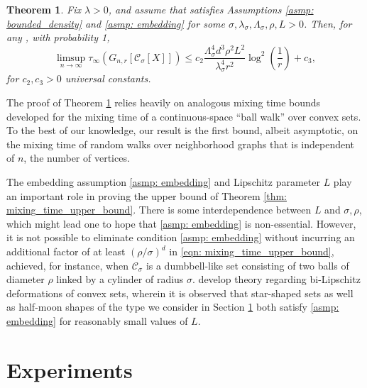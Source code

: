 \documentclass[11pt,twoside]{article}
\newtheorem{theorem}{Theorem}
\newcommand{\1}{\mathbf{1}}
\newcommand{\Xbf}{X}             %
\newcommand{\Cbb}{\mathbb{C}}
\newcommand{\Cset}{\mathcal{C}}
\newcommand{\Csig}{\Cset_{\sigma}}
\begin{document}
\begin{theorem}
  \label{thm: mixing_time_upper_bound}
  Fix $\lambda > 0$, and assume that \smash{$\Cset \in \Cbb_f(\lambda)$}
  satisfies Assumptions \ref{asmp: bounded_density} and \ref{asmp: embedding}
  for some $\sigma, \lambda_{\sigma}, \Lambda_{\sigma}, \rho, L > 0$. Then, for
  any , with probability 1,
  \begin{equation} 
    \label{eqn: mixing_time_upper_bound}
    \limsup_{n \to \infty}\tau_{\infty}(G_{n,r}[\Csig[\Xbf]]) \leq c_2
    \frac{\Lambda_{\sigma}^4 d^3 \rho^2 L^2}{\lambda_{\sigma}^4 r^2}
    \log^2\left(\frac{1}{r}\right) + c_3,
  \end{equation}
  for $c_2,c_3 > 0$ universal constants. 
\end{theorem}

The proof of Theorem \ref{thm: mixing_time_upper_bound} relies heavily on
analogous mixing time bounds developed for the mixing time of a
continuous-space ``ball walk'' over convex sets. To the best of our knowledge, our
result is the first bound, albeit asymptotic, on the mixing time of random walks
over neighborhood graphs that is independent of $n$, the number of vertices.   

\vspace{0.2cm}

  The embedding assumption \ref{asmp: embedding} and Lipschitz parameter $L$
  play an important role in proving the upper bound of Theorem \ref{thm:
    mixing_time_upper_bound}. There is some interdependence between $L$ and
  $\sigma,\rho$, which might lead one to hope that \ref{asmp: embedding} is
  non-essential. However, it is not possible to eliminate condition \ref{asmp:
    embedding} without incurring an additional factor of at least
  $(\rho/\sigma)^d$ in \eqref{eqn: mixing_time_upper_bound}, achieved, for
  instance, when $\Csig$ is a dumbbell-like set consisting of two balls of
  diameter $\rho$ linked by a cylinder of radius
  $\sigma$. \citet{abbasi-yadkori2016, abbasi-yadkori2016a}  
  develop theory regarding bi-Lipschitz deformations of convex sets, wherein it
  is observed that star-shaped sets as well as half-moon shapes of the type we
  consider in Section \ref{sec: experiments} both satisfy \ref{asmp: embedding}
  for reasonably small values of $L$. 

\section{Experiments}
\label{sec: experiments}
\end{document}
